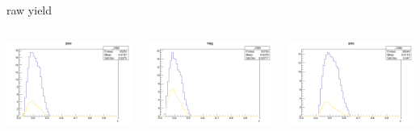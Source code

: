 \begin{frame}{raw yield}
\begin{columns}
\begin{column}[T]{0.25\textwidth}
\includegraphics[width = \textwidth]{results/yield/statistics/yield_x_Q2_z_0.45_4.750_0.40_pos.png}
\end{column}
\begin{column}[T]{0.25\textwidth}
\includegraphics[width = \textwidth]{results/yield/statistics/yield_x_Q2_z_0.45_4.750_0.40_neg.png}
\end{column}
\begin{column}[T]{0.25\textwidth}
\includegraphics[width = \textwidth]{results/yield/statistics/yield_x_Q2_z_0.45_4.750_0.50_pos.png}

\end{column}
\end{columns}
\end{frame}
